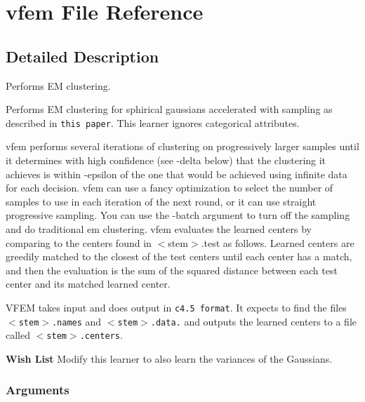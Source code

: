 \section{vfem File Reference}
\label{vfem}


\subsection{Detailed Description}
Performs EM clustering. 

Performs EM clustering for sphirical gaussians accelerated with sampling as described in {\tt this paper}. This learner ignores categorical attributes.

vfem performs several iterations of clustering on progressively larger samples until it determines with high confidence (see -delta below) that the clustering it achieves is within -epsilon of the one that would be achieved using infinite data for each decision. vfem can use a fancy optimization to select the number of samples to use in each iteration of the next round, or it can use straight progressive sampling. You can use the -batch argument to turn off the sampling and do traditional em clustering. vfem evaluates the learned centers by comparing to the centers found in $<$stem$>$.test as follows. Learned centers are greedily matched to the closest of the test centers until each center has a match, and then the evaluation is the sum of the squared distance between each test center and its matched learned center.

VFEM takes input and does output in {\tt c4.5 format}. It expects to find the files {\tt $<$stem$>$.names} and {\tt $<$stem$>$.data.} and outputs the learned centers to a file called {\tt $<$stem$>$.centers}.

\begin{Desc}
\item[{\bf Wish List}]Modify this learner to also learn the variances of the Gaussians. \end{Desc}
\subsubsection*{Arguments}

